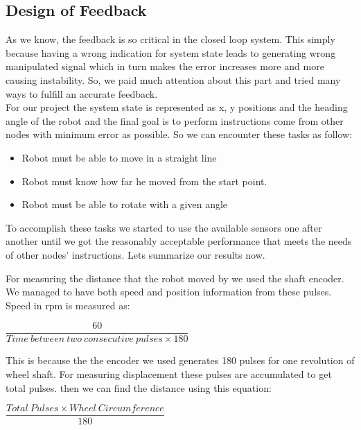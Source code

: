 \documentclass[12pt]{article}
\begin{document}
	\subsection{Design of Feedback}
	As we know, the feedback is so critical in the closed loop system. This simply because having a wrong indication for system state leads to generating wrong manipulated signal which in turn makes the error increases more and more causing instability. So, we paid much attention about this part and tried many ways to fulfill an accurate feedback. \\
	For our project the system state is represented as x, y positions and the heading angle of the robot and the final goal is to perform instructions come from other nodes with minimum error as possible. So we can encounter these tasks as follow:
	\begin{itemize}
		\item Robot must be able to move in a straight line
		\item Robot must know how far he moved from the start point.
		\item Robot must be able to rotate with a given angle
	\end{itemize}

	\noindent To accomplish these tasks we started to use the available sensors one after another until we got the reasonably acceptable performance that meets the needs of other nodes' instructions. Lets summarize our results now.
	
	\noindent For measuring the distance that the robot moved by we used the shaft encoder. We managed to have both speed and position information from these pulses. Speed in rpm is measured as:
	\begin{center}
		$ \dfrac{60}{Time\ between\ two\ consecutive\ pulses \times 180} $
	\end{center}
	\noindent This is because the the encoder we used generates 180 pulses for one revolution of wheel shaft. For measuring displacement these pulses are accumulated to get total pulses. then we can find the distance using this equation:
	\begin{center}
		$ \dfrac{Total\ Pulses  \times Wheel\ Circumference}{180} $
	\end{center}
	


\newpage
\end{document}
